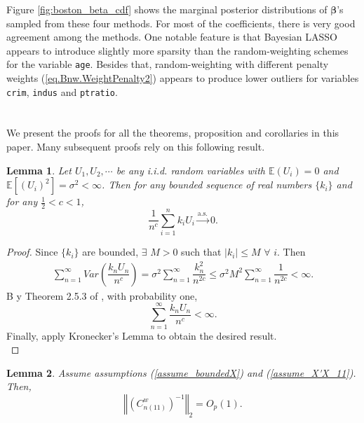 \documentclass[ejs,authoryear,linksfromyear]{imsart}
\newcommand{\sumin}{\sum_{i=1}^n} %
\newcommand{\CONV}[1]{\stackrel{\text{#1}}{\longrightarrow}} %
\newcommand{\cnwa}{C_{n(11)}^w}
\numberwithin{equation}{section}
\theoremstyle{plain}
\newtheorem{lem}{Lemma}[section]
\begin{document}
Figure \ref{fig:boston_beta_cdf} shows the marginal posterior distributions of $\bm{\beta}$'s sampled from these four methods. For most of the coefficients, there is very good agreement among the methods. One notable feature is that Bayesian LASSO appears to introduce slightly more sparsity than the random-weighting schemes for the variable \texttt{age}. Besides that, random-weighting with different penalty weights (\ref{eq.Bnw.WeightPenalty2}) appears to produce lower outliers for variables \texttt{crim}, \texttt{indus} and \texttt{ptratio}.     

\appendix

\section{} \label{sec_Appendix}

We present the proofs for all the theorems, proposition and corollaries in this paper. Many subsequent proofs rely on this following result.

\allowdisplaybreaks

\begin{lem} \label{lem_ASconv}
	Let $U_1, U_2, \cdots$ be any i.i.d. random variables with $\mathbb{E} (U_i) = 0$ and $\mathbb{E} [(U_i)^2] = \sigma^2 < \infty$. Then for any bounded sequence of real numbers $\{k_i\}$ and for any $\frac{1}{2} < c < 1$, 
	$$
	\dfrac{1}{n^c}
	\sumin k_i U_i \CONV{a.s.} 0.
	$$ 
\end{lem}

\begin{proof}
	Since $\{k_i\}$ are bounded, $\exists$ $M>0$ such that $|k_i| \leq M$ $\forall$ $i$. Then
	\begin{align*}
	\sum_{n=1}^{\infty} Var
	\left( \dfrac{k_n U_n}{n^c} \right)
	= \sigma^2 \sum_{n=1}^{\infty} \dfrac{k_n^2}{n^{2c}} 
	\leq \sigma^2 M^2 \sum_{n=1}^{\infty} \dfrac{1}{n^{2c}} 
	< \infty.
	\end{align*} 
	B  y Theorem 2.5.3 of \citet{durrett}, with probability one,
	$$
	\sum_{n=1}^{\infty}  \dfrac{k_n U_n}{n^c} < \infty.
	$$
	Finally, apply Kronecker's Lemma to obtain the desired result. \\
\end{proof}

\begin{lem} \label{lem_Cnw11inv}
	Assume assumptions (\ref{assume_boundedX}) and (\ref{assume_X'X_11}). Then, 
	$$
	\left\Vert
	\left( \cnwa \right)^{-1} 
	\right\Vert_2
	= O_p(1).
	$$
\end{lem} 
\end{document}
